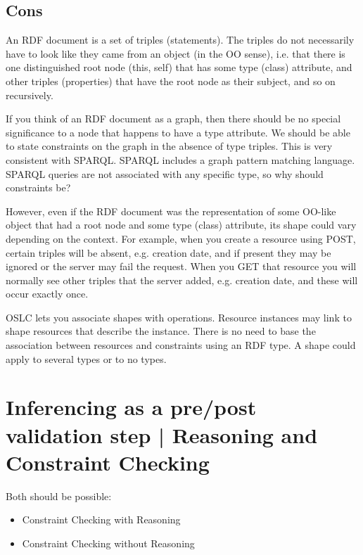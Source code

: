 \documentclass{llncs}
\begin{document}
\subsection{Cons}
An RDF document is a set of triples (statements). The triples do not 
necessarily have to look like they came from an object (in the OO sense), 
i.e. that there is one distinguished root node (this, self) that has some 
type (class) attribute, and other triples (properties) that have the root 
node as their subject, and so on recursively. 

If you think of an RDF document as a graph, then there should be no special 
significance to a node that happens to have a type attribute. We should be 
able to state constraints on the graph in the absence of type triples. 
This is very consistent with SPARQL. SPARQL includes a graph pattern 
matching language. SPARQL queries are not associated with any specific 
type, so why should constraints be?

However, even if the RDF document was the representation of some OO-like 
object that had a root node and some type (class) attribute, its shape 
could vary depending on the context. For example, when you create a 
resource using POST, certain triples will be absent, e.g. creation date, 
and if present they may be ignored or the server may fail the request. 
When you GET that resource you will normally see other triples that the 
server added, e.g. creation date, and these will occur exactly once. 

OSLC lets you associate shapes with operations. Resource instances may 
link to shape resources that describe the instance. There is no need to 
base the association between resources and constraints using an RDF type. 
A shape could apply to several types or to no types.

\section{Inferencing as a pre/post validation step | Reasoning and Constraint Checking}

Both should be possible: 

\begin{itemize}
	\item Constraint Checking with Reasoning
	\item Constraint Checking without Reasoning
\end{itemize}
\end{document}
